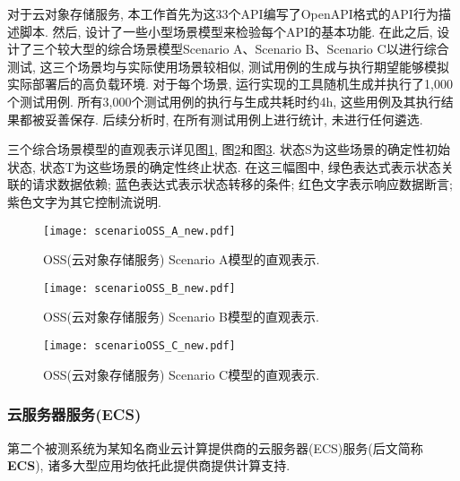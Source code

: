                 对于云对象存储服务, 本工作首先为这33个API编写了OpenAPI格式的API行为描述脚本. 然后, 设计了一些小型场景模型来检验每个API的基本功能. 在此之后, 设计了三个较大型的综合场景模型Scenario A、Scenario B、Scenario C以进行综合测试, 这三个场景均与实际使用场景较相似, 测试用例的生成与执行期望能够模拟实际部署后的高负载环境. 对于每个场景, 运行实现的工具随机生成并执行了1,000个测试用例. 所有3,000个测试用例的执行与生成共耗时约4h, 这些用例及其执行结果都被妥善保存. 后续分析时, 在所有测试用例上进行统计, 未进行任何遴选.

                三个综合场景模型的直观表示详见图\ref{fig:oss_scenario_A}, 图\ref{fig:oss_scenario_B}和图\ref{fig:oss_scenario_C}. 状态S为这些场景的确定性初始状态, 状态T为这些场景的确定性终止状态. 在这三幅图中, 绿色表达式表示状态关联的请求数据依赖; 蓝色表达式表示状态转移的条件; 红色文字表示响应数据断言; 紫色文字为其它控制流说明.

                \begin{figure}
                    \centering
                    \texttt{[image: scenarioOSS\_A\_new.pdf]}
                    \caption[云对象存储服务Scenario A]{OSS(云对象存储服务) Scenario A模型的直观表示.}
                    \label{fig:oss_scenario_A}
                \end{figure}
                
                 \begin{figure}
                    \centering
                    \texttt{[image: scenarioOSS\_B\_new.pdf]}
                    \caption[云对象存储服务Scenario B]{OSS(云对象存储服务) Scenario B模型的直观表示.}
                    \label{fig:oss_scenario_B}
                \end{figure}
                
                 \begin{figure}
                    \centering
                    \texttt{[image: scenarioOSS\_C\_new.pdf]}
                    \caption[云对象存储服务Scenario C]{OSS(云对象存储服务) Scenario C模型的直观表示.}
                    \label{fig:oss_scenario_C}
                \end{figure}
            
            \subsubsection*{云服务器服务(ECS)}
                第二个被测系统为某知名商业云计算提供商的云服务器(ECS)服务(后文简称\textbf{ECS}), 诸多大型应用均依托此提供商提供计算支持. 
                
